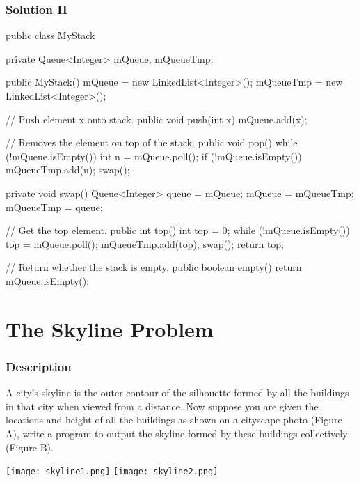 \newpage

\subsubsection{Solution II}

\begin{Code}
public class MyStack {

    private Queue<Integer> mQueue, mQueueTmp;

    public MyStack() {
        mQueue = new LinkedList<Integer>();
        mQueueTmp = new LinkedList<Integer>();
    }

    // Push element x onto stack.
    public void push(int x) {
        mQueue.add(x);
    }

    // Removes the element on top of the stack.
    public void pop() {
        while (!mQueue.isEmpty()) {
            int n = mQueue.poll();
            if (!mQueue.isEmpty()) {
                mQueueTmp.add(n);
            }
        }
        swap();
    }

    private void swap() {
        Queue<Integer> queue = mQueue;
        mQueue = mQueueTmp;
        mQueueTmp = queue;
    }

    // Get the top element.
    public int top() {
        int top = 0;
        while (!mQueue.isEmpty()) {
            top = mQueue.poll();
            mQueueTmp.add(top);
        }
        swap();
        return top;
    }

    // Return whether the stack is empty.
    public boolean empty() {
        return mQueue.isEmpty();
    }
}
\end{Code}

\newpage

\section{The Skyline Problem} %

\subsubsection{Description}
A city's skyline is the outer contour of the silhouette formed by all the buildings in that city when viewed from a distance. Now suppose you are given the locations and height of all the buildings as shown on a cityscape photo (Figure A), write a program to output the skyline formed by these buildings collectively (Figure B).

\begin{center}
\texttt{[image: skyline1.png]}
\texttt{[image: skyline2.png]}
\end{center}

